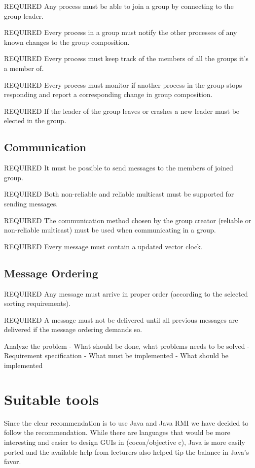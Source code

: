 \documentclass[11pt,swedish]{article}
\begin{document}
REQUIRED Any process must be able to join a group by connecting to the group leader.

REQUIRED Every process in a group must notify the other processes of any known changes to the group composition.

REQUIRED Every process must keep track of the members of all the groups it's a member of.

REQUIRED Every process must monitor if another process in the group stops responding and report a corresponding change in group composition.

REQUIRED If the leader of the group leaves or crashes a new leader must be elected in the group.



\subsection{Communication}
REQUIRED It must be possible to send messages to the members of joined group.

REQUIRED Both non-reliable and reliable multicast must be supported for sending messages.

REQUIRED The communication method chosen by the group creator (reliable or non-reliable multicast) must be used when communicating in a group.

REQUIRED Every message must contain a updated vector clock.



\subsection{Message Ordering}
REQUIRED Any message must arrive in proper order (according to the selected sorting requirements).

REQUIRED A message must not be delivered until all previous messages are delivered if the message ordering demands so.


Analyze the problem
- What should be done, what problems needs to be solved
- Requirement specification
- What must be implemented
- What should be implemented

\section{Suitable tools}
Since the clear recommendation is to use Java and Java RMI we have decided to follow the recommendation. While there are languages that would be more interesting and easier to design GUIs in (cocoa/objective c), Java is more easily ported and the available help from lecturers also helped tip the balance in Java's favor.
\end{document}
